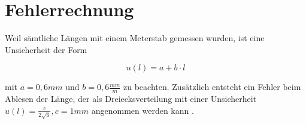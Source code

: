 \section{Fehlerrechnung}
Weil sämtliche Längen mit einem Meterstab gemessen wurden, ist eine Unsicherheit der Form

\begin{equation}
    u(l) = a+b\cdot l
\end{equation}

mit $a = 0,6\si{mm}$ und $b = 0,6 \frac{\si{mm}}{\si{m}}$ zu beachten. Zusätzlich entsteht ein Fehler beim Ablesen der Länge, der als Dreiecksverteilung mit einer Unsicherheit $u(l) = \frac c{2\sqrt 6}, c = 1\si{mm}$ angenommen werden kann \cite{ABW}.